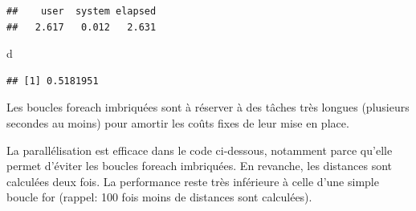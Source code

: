 \documentclass[
  12pt,
  french,
  a4paper,
  extrafontsizes,onecolumn,openright
  ]{memoir}
\newenvironment{Shaded}{\begin{snugshade}}{\end{snugshade}}
\newcommand{\ControlFlowTok}[1]{\textcolor[rgb]{0.13,0.29,0.53}{\textbf{#1}}}
\newcommand{\DataTypeTok}[1]{\textcolor[rgb]{0.13,0.29,0.53}{#1}}
\newcommand{\DecValTok}[1]{\textcolor[rgb]{0.00,0.00,0.81}{#1}}
\newcommand{\KeywordTok}[1]{\textcolor[rgb]{0.13,0.29,0.53}{\textbf{#1}}}
\newcommand{\NormalTok}[1]{#1}
\newcommand{\OperatorTok}[1]{\textcolor[rgb]{0.81,0.36,0.00}{\textbf{#1}}}
\newcommand{\StringTok}[1]{\textcolor[rgb]{0.31,0.60,0.02}{#1}}
\newlength{\rf}
\begin{document}
\begin{verbatim}
##    user  system elapsed 
##   2.617   0.012   2.631
\end{verbatim}

\begin{Shaded}
\begin{Highlighting}[]
\NormalTok{d}
\end{Highlighting}
\end{Shaded}

\begin{verbatim}
## [1] 0.5181951
\end{verbatim}

\normalsize

Les boucles foreach imbriquées sont à réserver à des tâches très longues (plusieurs secondes au moins) pour amortir les coûts fixes de leur mise en place.

La parallélisation est efficace dans le code ci-dessous, notamment parce qu'elle permet d'éviter les boucles foreach imbriquées.
En revanche, les distances sont calculées deux fois.
La performance reste très inférieure à celle d'une simple boucle for (rappel: 100 fois moins de distances sont calculées).

\scriptsize

\begin{Shaded}
\end{Shaded}
\end{document}
